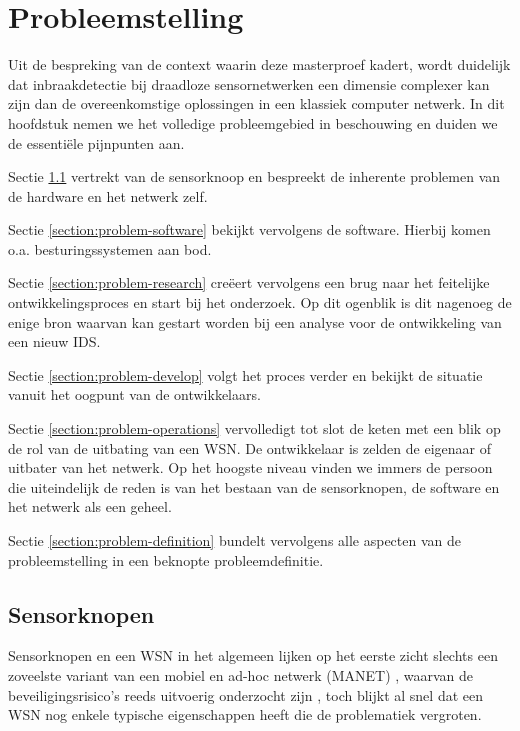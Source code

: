 
\chapter{Probleemstelling}
\label{chapter:probleemstelling}

Uit de bespreking van de context waarin deze masterproef kadert, wordt
duidelijk dat inbraakdetectie bij draadloze sensornetwerken een dimensie
complexer kan zijn dan de overeenkomstige oplossingen in een klassiek computer
netwerk. In dit hoofdstuk nemen we het volledige probleemgebied in beschouwing
en duiden we de essenti\"ele pijnpunten aan.

Sectie \ref{section:problem-hardware} vertrekt van de sensorknoop en bespreekt
de inherente problemen van de hardware en het netwerk zelf.

Sectie \ref{section:problem-software} bekijkt vervolgens de software. Hierbij
komen o.a. besturingssystemen aan bod.

Sectie \ref{section:problem-research} cre\"eert vervolgens een brug naar het
feitelijke ontwikkelingsproces en start bij het onderzoek. Op dit ogenblik is
dit nagenoeg de enige bron waarvan kan gestart worden bij een analyse voor de
ontwikkeling van een nieuw IDS.

Sectie \ref{section:problem-develop} volgt het proces verder en bekijkt de
situatie vanuit het oogpunt van de ontwikkelaars.

Sectie \ref{section:problem-operations} vervolledigt tot slot de keten met een
blik op de rol van de uitbating van een WSN. De ontwikkelaar is zelden de
eigenaar of uitbater van het netwerk. Op het hoogste niveau vinden we immers de
persoon die uiteindelijk de reden is van het bestaan van de sensorknopen, de
software en het netwerk als een geheel.

Sectie \ref{section:problem-definition} bundelt vervolgens alle aspecten van de
probleemstelling in een beknopte probleemdefinitie.

\section{Sensorknopen}
\label{section:problem-hardware}

Sensorknopen en een WSN in het algemeen lijken op het eerste zicht slechts een
zoveelste variant van een mobiel en ad-hoc netwerk (MANET)
\citep{garg2010mobile}, waarvan de beveiligingsrisico's reeds uitvoerig
onderzocht zijn \citep{djenouri2005survey, zhang2000intrusion,
kachirski2003effective}, toch blijkt al snel dat een WSN nog enkele typische
eigenschappen heeft die de problematiek vergroten.

